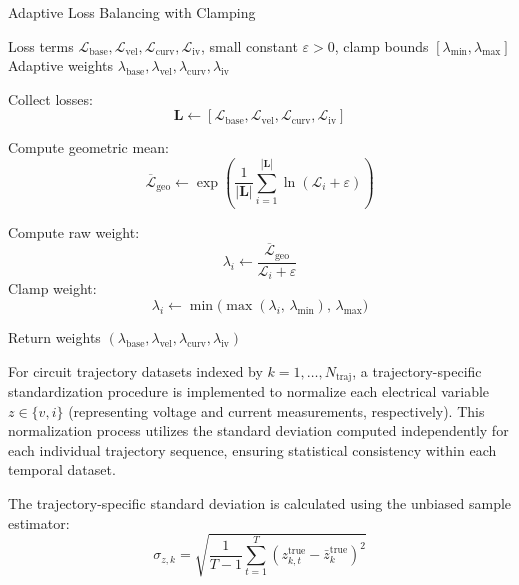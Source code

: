 \documentclass[11pt, oneside]{article}
\begin{document}
\begin{algorithm}[H]
    \caption{Adaptive Loss Balancing with Clamping}
    \label{alg:adaptive_loss_balancing}
    \begin{algorithmic}[1]
        \Require Loss terms $\mathcal{L}_{\text{base}}, \mathcal{L}_{\text{vel}}, \mathcal{L}_{\text{curv}}, \mathcal{L}_{\text{iv}}$, small constant $\varepsilon > 0$, clamp bounds $[\lambda_{\min}, \lambda_{\max}]$
        \Ensure Adaptive weights $\lambda_{\text{base}}, \lambda_{\text{vel}}, \lambda_{\text{curv}}, \lambda_{\text{iv}}$
        \Statex

        \State Collect losses:
        \[
            \mathbf{L} \gets [\mathcal{L}_{\text{base}}, \mathcal{L}_{\text{vel}}, \mathcal{L}_{\text{curv}}, \mathcal{L}_{\text{iv}}]
        \]

        \State Compute geometric mean:
        \[
            \overline{\mathcal{L}}_{\text{geo}} \gets \exp\!\left(\frac{1}{|\mathbf{L}|} \sum_{i=1}^{|\mathbf{L}|} \ln(\mathcal{L}_i + \varepsilon)\right)
        \]

        \State Compute raw weight:
        \[
            \lambda_i \gets \frac{\overline{\mathcal{L}}_{\text{geo}}}{\mathcal{L}_i + \varepsilon}
        \]
        \State Clamp weight:
        \[
            \lambda_i \gets \min\!\big(\max(\lambda_i, \, \lambda_{\min}), \, \lambda_{\max}\big)
        \]
        \EndFor

        \State Return weights $(\lambda_{\text{base}}, \lambda_{\text{vel}}, \lambda_{\text{curv}}, \lambda_{\text{iv}})$
    \end{algorithmic}
\end{algorithm}


For circuit trajectory datasets indexed by $k = 1, \ldots, N_{\text{traj}}$, a trajectory-specific standardization procedure is implemented to normalize each electrical variable $z \in \{v, i\}$ (representing voltage and current measurements, respectively). This normalization process utilizes the standard deviation computed independently for each individual trajectory sequence, ensuring statistical consistency within each temporal dataset.

The trajectory-specific standard deviation is calculated using the unbiased sample estimator:
\begin{equation}
    \sigma_{z,k} = \sqrt{\frac{1}{T-1} \sum_{t=1}^{T} \left(z_{k,t}^{\mathrm{true}} - \bar{z}_k^{\mathrm{true}}\right)^2}
\end{equation}
\end{document}
